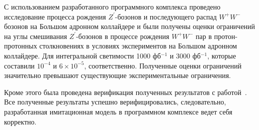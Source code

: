 С использованием разработанного программного комплекса проведено исследование процесса рождения ${Z}^{\prime}$-бозонов и последующего распад ${W}^{+}{W}^{-}$ бозонов на Большом адронном коллайдере и были получены оценки ограничений на углы смешивания ${Z}^{\prime}$-бозонов в
процессе рождения ${W}^{+}$${W}^{-}$ пар в протон-протонных столкновениях
в условиях экспериментов на Большом адронном коллайдере. Для интегральной светимости 1000 фб${}^{-1}$ и 3000 фб${}^{-1}$, которые составили  ${10}^{-4}$ и $6\times{10}^{-5}$, соответственно. Полученные оценки ограничений значительно превышают существующие экспериментальные ограничения.

Кроме этого была проведена верификация полученных результатов с
работой~\cite{2part-pankov}. Все полученные результаты успешно верифицировались,
следовательно, разработанная имитационная модель в программном комплексе
ведет себя корректно.